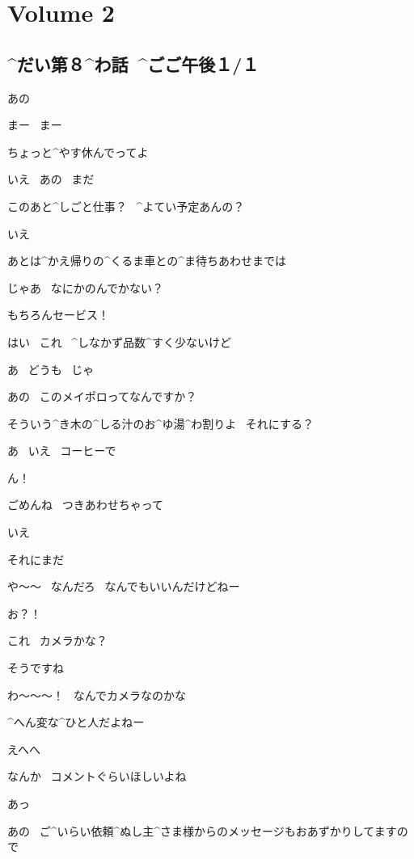 \section{Volume 2}

\subsection{^{だい}{第}８^{わ}{話}\ ^{ごご}{午後}１/１}

\page[4]
\Kokone あの

\Alpha まー
\ まー

\Alpha ちょっと^{やす}{休}んでってよ

\Kokone いえ
\ あの
\ まだ

\Alpha このあと^{しごと}{仕事}？
\ ^{よてい}{予定}あんの？

\Kokone いえ

\Kokone あとは^{かえ}{帰}りの^{くるま}{車}との^{ま}{待}ちあわせまでは

\Alpha じゃあ
\ なにかのんでかない？

\Alpha もちろんセービス！

\Alpha はい
\ これ
\ ^{しなかず}{品数}^{すく}{少}ないけど

\Kokone あ
\ どうも
\ じゃ

\page
\Kokone あの
\ このメイポロってなんですか？

\Alpha そういう^{き}{木}の^{しる}{汁}のお^{ゆ}{湯}^{わ}{割}りよ
\ それにする？

\Kokone あ
\ いえ
\ コーヒーで

\Alpha ん！

\Alpha ごめんね
\ つきあわせちゃって

\Kokone いえ

\Kokone それにまだ

\Alpha や〜〜
\ なんだろ
\ なんでもいいんだけどねー

\page
\Alpha お？！

\Alpha これ
\ カメラかな？

\Kokone そうですね

\Alpha わ〜〜〜！
\ なんでカメラなのかな

\Alpha ^{へん}{変}な^{ひと}{人}だよねー

\Alpha えへへ

\Alpha なんか
\ コメントぐらいほしいよね

\Kokone あっ

\page
\Kokone あの
\ ご^{いらい}{依頼}^{ぬし}{主}^{さま}{様}からのメッセージもおあずかりしてますので

